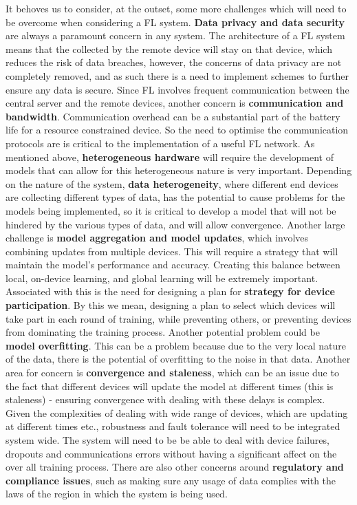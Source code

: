 \documentclass[conference]{IEEEtran}
\begin{document}
It behoves us to consider, at the outset, some more challenges which will need to be overcome when considering a FL system. \textbf{Data privacy and data security} are always a paramount concern in any system. The architecture of a FL system means that the collected by the remote device will stay on that device, which reduces the risk of data breaches, however, the concerns of data privacy are not completely removed, and as such there is a need to implement schemes to further ensure any data is secure. Since FL involves frequent communication between the central server and the remote devices, another concern is \textbf{communication and bandwidth}. Communication overhead can be a substantial part of the battery life for a resource constrained device. So the need to optimise the communication protocols are is critical to the implementation of a useful FL network. As mentioned above, \textbf{heterogeneous hardware} will require the development of models that can allow for this heterogeneous nature is very important. Depending on the nature of the system, \textbf{data heterogeneity}, where different end devices are collecting different types of data, has the potential to cause problems for the models being implemented, so it is critical to develop a model that will not be hindered by the various types of data, and will allow convergence. Another large challenge is \textbf{model aggregation and model updates}, which involves combining updates from multiple devices. This will require a strategy that will maintain the model's performance and accuracy. Creating this balance between local, on-device learning, and global learning will be extremely important. Associated with this is the need for designing a plan for \textbf{strategy for device participation}. By this we mean, designing a plan to select which devices will take part in each round of training, while preventing others, or preventing devices from dominating the training process. Another potential problem could be \textbf{model overfitting}. This can be a problem because due to the very local nature of the data, there is the potential of overfitting to the noise in that data. Another area for concern is \textbf{convergence and staleness}, which can be an issue due to the fact that different devices will update the model at different times (this is staleness) - ensuring convergence with dealing with these delays is complex. Given the complexities of dealing with wide range of devices, which are updating at different times etc., robustness and fault tolerance will need to be integrated system wide. The system will need to be be able to deal with device failures, dropouts and communications errors without having a significant affect on the over all training process. There are also other concerns around \textbf{regulatory and compliance issues}, such as making sure any usage of data complies with the laws of the region in which the system is being used.
\end{document}
